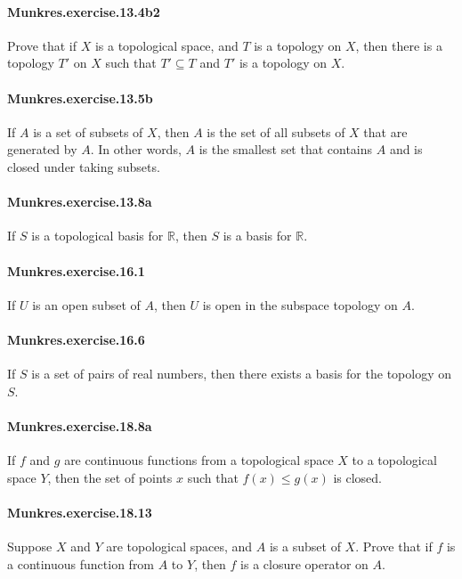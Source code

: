 \documentclass{article}
\begin{document}
\paragraph{Munkres.exercise.13.4b2} Prove that if $X$ is a topological space, and $T$ is a topology on $X$, then there is a topology $T'$ on $X$ such that $T' \subseteq T$ and $T'$ is a topology on $X$.

\paragraph{Munkres.exercise.13.5b} If $A$ is a set of subsets of $X$, then $A$ is the set of all subsets of $X$ that are generated by $A$. In other words, $A$ is the smallest set that contains $A$ and is closed under taking subsets.

\paragraph{Munkres.exercise.13.8a} If $S$ is a topological basis for $\mathbb{R}$, then $S$ is a basis for $\mathbb{R}$.

\paragraph{Munkres.exercise.16.1} If $U$ is an open subset of $A$, then $U$ is open in the subspace topology on $A$.

\paragraph{Munkres.exercise.16.6} If $S$ is a set of pairs of real numbers, then there exists a basis for the topology on $S$.

\paragraph{Munkres.exercise.18.8a} If $f$ and $g$ are continuous functions from a topological space $X$ to a topological space $Y$, then the set of points $x$ such that $f(x) \leq g(x)$ is closed.

\paragraph{Munkres.exercise.18.13} Suppose $X$ and $Y$ are topological spaces, and $A$ is a subset of $X$. Prove that if $f$ is a continuous function from $A$ to $Y$, then $f$ is a closure operator on $A$.
\end{document}
